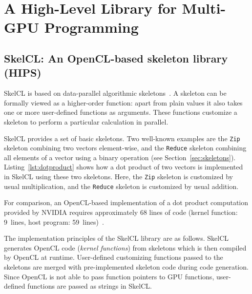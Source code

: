 
\chapter{A High-Level Library for Multi-GPU Programming}

\label{ch:third} %



\section{SkelCL: An OpenCL-based skeleton library (HIPS)}

SkelCL is based on data-parallel algorithmic skeletons~\cite{RaG-03}.
A skeleton can be formally viewed as a higher-order function:
apart from plain values it also takes one or more user-defined functions as arguments.
These functions customize a skeleton to perform a particular calculation in parallel.

SkelCL provides a set of basic skeletons.
Two well-known examples are the \texttt{Zip} skeleton combining two vectors element-wise, and the \texttt{Reduce} skeleton combining all elements of a vector using a binary operation (see Section~\ref{sec:skeletons}).
Listing~\ref{lst:dotproduct} shows how a dot product of two vectors is implemented in SkelCL using these two skeletons.
Here, the \texttt{Zip} skeleton is customized by usual multiplication, and the \texttt{Reduce} skeleton is customized by usual addition.

For comparison, an OpenCL-based implementation of a dot product computation provided by NVIDIA requires approximately 68 lines of code (kernel function: 9~lines, host program: 59~lines)~\cite{CUDASDK-10}.

The implementation principles of the SkelCL library are as follows.
SkelCL generates OpenCL code (\emph{kernel functions}) from skeletons which is then compiled by OpenCL at runtime.
User-defined customizing functions passed to the skeletons are merged with pre-implemented skeleton code during code generation.
Since OpenCL is not able to pass function pointers to GPU functions, user-defined functions are passed as strings in SkelCL.

